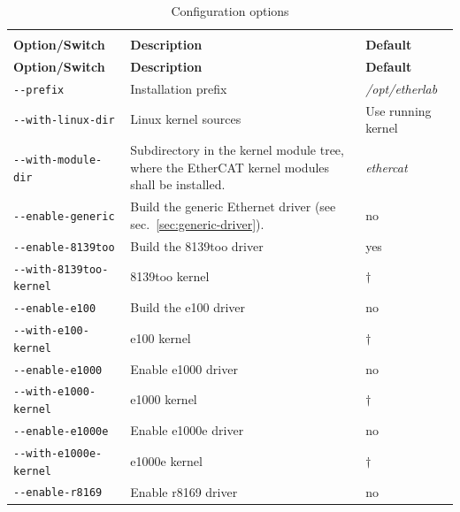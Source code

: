 \documentclass[a4paper,12pt,BCOR6mm,bibtotoc,idxtotoc]{scrbook}
\begin{document}
\begin{longtable}{l|p{}|l}
  \caption{Configuration options}\rule[-5ex]{0mm}{0mm}
  \label{tab:config}\\

\textbf{Option/Switch} & \textbf{Description} & \textbf{Default}\\\hline
\endfirsthead

\textbf{Option/Switch} & \textbf{Description} & \textbf{Default}\\\hline
\endhead

\lstinline+--prefix+ & Installation prefix & \textit{/opt/etherlab}\\

\lstinline+--with-linux-dir+ & Linux kernel sources & Use running kernel\\

\lstinline+--with-module-dir+ & Subdirectory in the kernel module tree, where
the EtherCAT kernel modules shall be installed. & \textit{ethercat}\\

\hline

\lstinline+--enable-generic+ & Build the generic Ethernet driver (see
sec.~\ref{sec:generic-driver}). & no\\

\lstinline+--enable-8139too+ & Build the 8139too driver & yes\\

\lstinline+--with-8139too-kernel+ & 8139too kernel & $\dagger$\\

\lstinline+--enable-e100+ & Build the e100 driver & no\\

\lstinline+--with-e100-kernel+ & e100 kernel & $\dagger$\\

\lstinline+--enable-e1000+ & Enable e1000 driver & no\\

\lstinline+--with-e1000-kernel+ & e1000 kernel & $\dagger$\\

\lstinline+--enable-e1000e+ & Enable e1000e driver & no\\

\lstinline+--with-e1000e-kernel+ & e1000e kernel & $\dagger$\\

\lstinline+--enable-r8169+ & Enable r8169 driver & no\\


\end{longtable}
\end{document}
